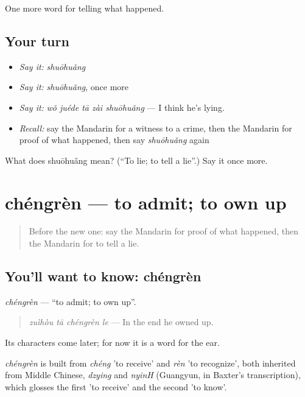 \begin{grammarlens}[title={What you've built}]
One more word for telling what happened.
\end{grammarlens}

\subsection*{Your turn}
\begin{itemize}
\raggedright
  \item \emph{Say it:} \emph{shuōhuǎng}
  \item \emph{Say it:} \emph{shuōhuǎng}, once more
  \item \emph{Say it:} \emph{wǒ juéde tā zài shuōhuǎng} — I think he's lying.
  \item \emph{Recall:} say the Mandarin for a witness to a crime, then the Mandarin for proof of what happened, then say \emph{shuōhuǎng} again
\end{itemize}

\begin{tcolorbox}[breakable,colback=teal!4,colframe=teal!35!black,title={Before you move on}]
What does shuōhuǎng mean? (\textquotedblleft{}To lie; to tell a lie\textquotedblright{}.) Say it once more.
\end{tcolorbox}
\section[chéngrèn]{chéngrèn — to admit; to own up}

\label{lesson:ZH-C310-chengren}



\begin{quote}
Before the new one: say the Mandarin for proof of what happened, then the Mandarin for to tell a lie.
\end{quote}

\subsection*{You'll want to know: chéngrèn}
\emph{chéngrèn} — \textquotedblleft{}to admit; to own up\textquotedblright{}.

\begin{quote}
\emph{zuìhòu tā chéngrèn le} — In the end he owned up.
\end{quote}

Its characters come later; for now it is a word for the ear.

\begin{cousinweb}
\emph{chéngrèn} is built from \emph{chéng} 'to receive' and \emph{rèn} 'to recognize', both inherited from Middle Chinese, \emph{dzying} and \emph{nyinH} (Guangyun, in Baxter's transcription), which glosses the first 'to receive' and the second 'to know'.
\end{cousinweb}

